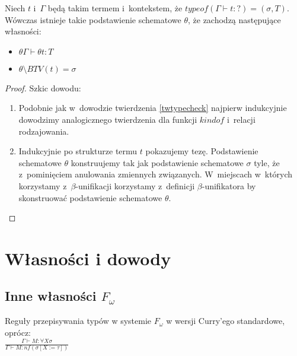 \documentclass[11pt,leqno]{article}
\begin{document}
\begin{twierdzenie}
Niech $t$ i~$\Gamma$ będą takim termem i~kontekstem, że $typeof(\Gamma \vdash t : ?) = (\sigma, T)$. Wówczas
istnieje takie podstawienie schematowe $\theta$, że zachodzą następujące własności:
\begin{itemize}
\item $\theta \Gamma \vdash \theta t : T$
\item $\theta \setminus BTV(t) = \sigma$
\end{itemize}
\end{twierdzenie}
\begin{proof}
Szkic dowodu:
\begin{enumerate}
\item Podobnie jak w~dowodzie twierdzenia \ref{twtypecheck} najpierw indukcyjnie dowodzimy analogicznego twierdzenia
dla funkcji $kindof$ i~relacji rodzajowania.
\item Indukcyjnie po strukturze termu $t$ pokazujemy tezę. Podstawienie schematowe $\theta$ konstruujemy tak jak podstawienie schematowe
$\sigma$ tyle, że z~pominięciem anulowania zmiennych związanych. W~miejscach w~których korzystamy z~$\beta$-unifikacji
korzystamy z~definicji \mbox{$\beta$-unifikatora} by skonstruować podstawienie schematowe $\theta$.
\end{enumerate}
\end{proof}


\section{Własności i dowody}
\setcounter{equation}{0}

\subsection{Inne własności $F_\omega$}

\begin{definicja}
Reguły przepisywania typów w systemie $F_{\omega}$ w wersji Curry'ego standardowe, oprócz: \\

$\frac{\Gamma \vdash M : \forall X \sigma}{\Gamma \vdash M : nf(\sigma [ X := \tau ])}$

\end{definicja}
\end{document}
